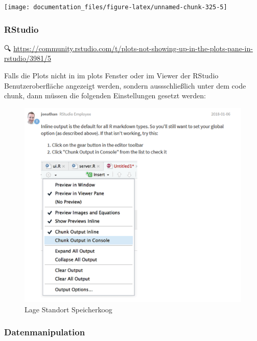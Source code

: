 \documentclass[
]{article}
\begin{document}
\begin{center}\texttt{[image: documentation\_files/figure-latex/unnamed-chunk-325-5]} \end{center}

\hypertarget{rstudio-1}{%
\subsubsection{RStudio}\label{rstudio-1}}

🔍 \url{https://community.rstudio.com/t/plots-not-showing-up-in-the-plots-pane-in-rstudio/3981/5}

Falls die Plots nicht in im plots Fenster oder im Viewer der RStudio Benutzeroberfläche angezeigt werden, sondern aussschließlich unter dem code chunk, dann müssen die folgenden Einstellungen gesetzt werden:

\begin{figure}

{\centering \includegraphics[width=1\linewidth]{images/047} 

}

\caption{Lage Standort Speicherkoog}\label{fig:unnamed-chunk-326}
\end{figure}

\hypertarget{datenmanipulation}{%
\subsubsection{Datenmanipulation}\label{datenmanipulation}}
\end{document}
